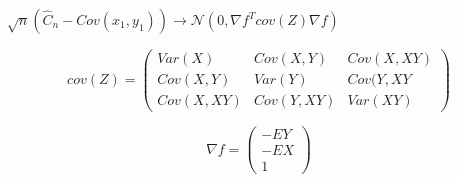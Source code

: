 \documentclass[12pt]{article}
\newcommand{\icol}[1]{%
  \left(\begin{smallmatrix}#1\end{smallmatrix}\right)%
}
\begin{document}
\begin{itemize}
  $\sqrt{n}(\hat C_n - Cov(x_1,y_1)) \rightarrow \mathcal N(0, \nabla f^T cov(Z) \nabla f) $

  \[ cov(Z) = \left(
      \begin{array}{ccc}
        Var(X) & Cov(X, Y)& Cov(X, XY)\\
        Cov(X,Y) & Var(Y) & Cov(Y, XY\\
        Cov(X, XY) &  Cov(Y, XY)& Var(XY) \end{array}
    \right)
  \]
\end{itemize}

$$\nabla f = \icol{ -EY\\ -EX \\1 }$$
\end{document}
